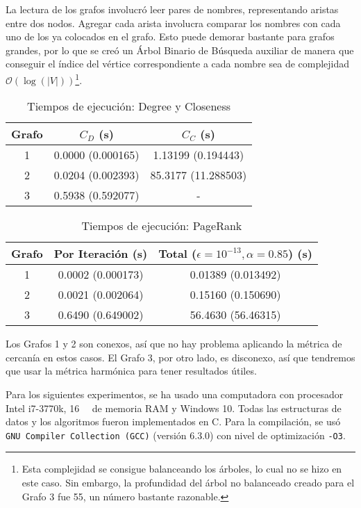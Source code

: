 \documentclass[journal]{IEEEtran}
\let\MYoriglatexcaption\caption
\renewcommand{\caption}[2][\relax]{\MYoriglatexcaption[#2]{#2}}
\newcommand{\pkg}[1]{\texttt{#1}}
\begin{document}
La lectura de los grafos involucró leer pares de nombres, representando aristas entre dos nodos. Agregar cada arista involucra comparar los nombres con cada uno de los ya colocados en el grafo. Esto puede demorar bastante para grafos grandes, por lo que se creó un Árbol Binario de Búsqueda auxiliar de manera que conseguir el índice del vértice correspondiente a cada nombre sea de complejidad \(\mathcal{O}(\log(|V|))\)\footnote{Esta complejidad se consigue balanceando los árboles, lo cual no se hizo en este caso. Sin embargo, la profundidad del árbol no balanceado creado para el Grafo 3 fue 55, un número bastante razonable.}.

\begin{table}[t]
	\renewcommand{\arraystretch}{1.3}
	\caption{Tiempos de ejecución: Degree y Closeness}
	\label{tab:tejecucion}
	\centering
	\begin{tabular}{c|c|c}
		\hline
		Grafo & \(C_D\) (s) & \(C_C\) (s) \\
		\hline\hline
		1 & 0.0000 (0.000165) & 1.13199 (0.194443) \\
		2 & 0.0204 (0.002393) & 85.3177 (11.288503) \\
		3 & 0.5938 (0.592077) & - \\
		\hline
	\end{tabular}
\end{table}

\begin{table}[t]
	\renewcommand{\arraystretch}{1.3}
	\caption{Tiempos de ejecución: PageRank}
	\label{tab:tpagerank}
	\centering
	\begin{tabular}{c|c|c}
		\hline
		Grafo & Por Iteración (s) & Total (\( \epsilon = 10^{-13}, \alpha = 0.85 \)) (s) \\
		\hline\hline
		1 & 0.0002 (0.000173) & 0.01389 (0.013492) \\
		2 & 0.0021 (0.002064) & 0.15160 (0.150690) \\
		3 & 0.6490 (0.649002) & 56.4630 (56.46315) \\
		\hline
	\end{tabular}
\end{table}

Los Grafos 1 y 2 son conexos, así que no hay problema aplicando la métrica de cercanía en estos casos. El Grafo 3, por otro lado, es disconexo, así que tendremos que usar la métrica harmónica para tener resultados útiles.

Para los siguientes experimentos, se ha usado una computadora con procesador Intel i7-3770k, \SI{16}{\giga\byte} de memoria RAM y Windows 10. Todas las estructuras de datos y los algoritmos fueron implementados en C. Para la compilación, se usó \pkg{GNU Compiler Collection (GCC)} (versión 6.3.0) con nivel de optimización \texttt{-O3}.
\end{document}
